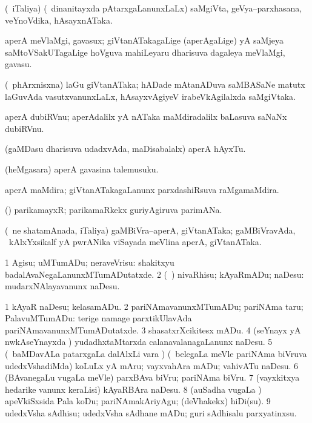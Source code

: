 \bentry
{}
\gl{\nA}
\bmng
(\kanmu\ iTaliya) (\kanmu\ dinanitayxda pAtarxgaLanunxLaLx) saMgiVta, geVya--parxhasana, veYnoVdika, hAsayxnATaka. 
\emng
\eentry

\bentry
{}
\gl{\nA}
\bmng
aperA meVlaMgi, gavasux; giVtanATakagaLige (aperAgaLige) yA saMjeya saMtoVSakUTagaLige hoVguva mahiLeyaru dharisuva dagaleya meVlaMgi, gavasu. 
\emng
\eentry

\bentry
{}
\gl{\nA}
\expl{\F}
\bmng
(\kanmu\ phArxnisxna) laGu giVtanATaka; hADade mAtanADuva saMBASaNe matutx laGuvAda vasutxvanunxLaLx, hAsayxvAgiyeV irabeVkAgilalxda saMgiVtaka. 
\emng
\eentry

\bentry
{}
\gl{\nA}
\bmng
aperA dubiRVnu; aperAdalilx yA nATaka maMdiradalilx baLasuva saNaNx dubiRVnu. 
\emng
\eentry

\bentry
{}
\gl{\nA}
\bmng
(gaMDasu dharisuva udadxvAda, maDisabalalx) aperA hAyxTu. 
\emng
\eentry

\bentry
{}
\gl{\nA}
\bmng
(heMgasara) aperA gavasina talemusuku. 
\emng
\eentry

\bentry
{}
\gl{\nA}
\bmng
aperA maMdira; giVtanATakagaLanunx parxdashiRsuva raMgamaMdira. 
\emng
\eentry

\bentry
{}
\gl{\nA}
\bmng
(\ga) parikamayxR; parikamaRkekx guriyAgiruva parimANa. 
\emng
\eentry

\bentry
{}
\gl{\nA}
\bmng
(\kanmu\ ne shatamAnada, iTaliya) gaMBiVra--aperA, giVtanATaka; gaMBiVravAda, \sA\ kAlxYxsikalf yA pwrANika viSayada meVlina aperA, giVtanATaka. 
\emng
\eentry

\bentry
{}
\gl{\sakirx}
\bmng
\bnum
\num{1} Agisu; uMTumADu; neraveVrisu:  shakitxyu badalAvaNegaLanunxMTumADutatxde. 
\num{2} (\kanmu\ \ame) nivaRhisu; kAyaRmADu; naDesu:  mudarxNAlayavanunx naDesu. 
\enum
\emng

\noindent
\gl{\akirx}
\bmng
\bnum
\num{1} kAyaR naDesu; kelasamADu. 
\num{2} pariNAmavanunxMTumADu; pariNAma taru; PalavuMTumADu:  terige namage parxtikUlavAda pariNAmavanunxMTumADutatxde. 
\num{3} shasatxrXcikitesx mADu. 
\num{4} (seYnayx yA nwkAseYnayxda \vi) yudadhxtaMtarxda calanavalanagaLanunx naDesu. 
\num{5} (\kanmu\ baMDavALa patarxgaLa dalAlxLi \mo vara \vi) (\kanmu\ belegaLa meVle pariNAma biVruva udedxVshadiMda) koLuLx yA mAru; vayxvahAra mADu; vahivATu naDesu. 
\num{6} (BAvanegaLu \mo vugaLa meVle) parxBAva biVru; pariNAma biVru. 
\num{7} (vayxkitxya hedarike \mo vanunx keraLisi) kAyaRBAra naDesu. 
\num{8} (auSadha \mo vugaLa \vi) apeVkiSxsida Pala koDu; pariNAmakAriyAgu; (deVhakekx) hiDi(su). 
\num{9} udedxVsha sAdhisu; udedxVsha sAdhane mADu; guri sAdhisalu parxyatinxsu. 
\enum
\emng
\eentry

